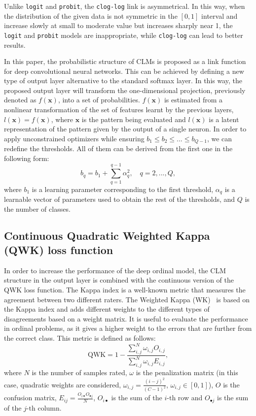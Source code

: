 \documentclass[preprint]{elsarticle}
\begin{document}
Unlike \texttt{logit} and \texttt{probit}, the \texttt{clog-log} link is asymmetrical. In this way, when the distribution of the given data is not symmetric in the $[0,1]$ interval and increase slowly at small to moderate value but increases sharply near 1, the \texttt{logit} and \texttt{probit} models are inappropriate, while \texttt{clog-log} can lead to better results.

In this paper, the probabilistic structure of CLMs is proposed as a link function for deep convolutional neural networks. This can be achieved by defining a new type of output layer alternative to the standard softmax layer. In this way, the proposed output layer will transform the one-dimensional projection, previously denoted as $f(\mathbf{x})$, into a set of probabilities. $f(\mathbf{x})$ is estimated from a nonlinear transformation of the set of features learnt by the previous layers, $l(\mathbf{x})=f(\mathbf{x})$, where $\mathbf{x}$ is the pattern being evaluated and $l(\mathbf{x})$ is a latent representation of the pattern given by the output of a single neuron. In order to apply unconstrained optimizers while ensuring $b_1 \le b_2 \le ... \le b_{Q-1}$, we can redefine the thresholds. All of them can be derived from the first one in the following form:
\begin{equation}
\nonumber
b_q = b_1 + \sum_{q=1}^{q-1} \alpha_q^2, \quad q = 2, ..., Q,
\end{equation}
where $b_1$ is a learning parameter corresponding to the first threshold, $\alpha_q$ is a learnable vector of parameters used to obtain the rest of the thresholds, and $Q$ is the number of classes.

\subsection{Continuous Quadratic Weighted Kappa (QWK) loss function}
\label{sect:wk}

In order to increase the performance of the deep ordinal model, the CLM structure in the output layer is combined with the continuous version of the QWK loss \cite{de2018weighted} function. The Kappa index is a well-known metric that measures the agreement between two different raters. The Weighted Kappa (WK)~\cite{ben2008comparison} is based on the Kappa index and adds different weights to the different types of disagreements based on a weight matrix. It is useful to evaluate the performance in ordinal problems, as it gives a higher weight to the errors that are further from the correct class. This metric is defined as follows:
\begin{equation}
\label{eq:qwk}
\text{QWK} = 1 - \frac{\sum\limits^N_{i,j} \omega_{i,j} O_{i,j}}{\sum\limits^N_{i,j} \omega_{i,j} E_{i,j}},
\end{equation}
where $N$ is the number of samples rated, $\omega$ is the penalization matrix (in this case, quadratic weights are considered, $\omega_{i,j} = \frac{(i-j)^2}{(C-1)^2}$, $\omega_{i,j} \in [0,1]$), $O$ is the confusion matrix, $E_{ij} = \frac{O_{i\bullet} O_{\bullet j}}{N}$, $O_{i\bullet}$ is the sum of the $i\text{-th}$ row and $O_{\bullet j}$ is the sum of the $j\text{-th}$ column.
\end{document}
